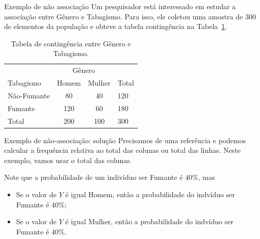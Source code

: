 \documentclass[9pt]{beamer}
\begin{document}
\begin{frame}{Exemplo de não associação}
Um pesquisador está interessado em estudar a associação entre Gênero e Tabagismo. Para isso, ele coletou uma amostra de 300 de elementos da população e obteve a tabela contingência na Tabela~\ref{tab:nao-associacao}.
\begin{table}[htbp]
	\centering
	\caption{Tabela de contingência entre Gênero e Tabagismo.}
	\label{tab:nao-associacao}
	\begin{tabular}{l|cc|l}
		\toprule[0.05cm]
		& \multicolumn{2}{|c|}{Gênero} & \\ \cmidrule{2-3}
		Tabagismo & Homem & Mulher & Total\\ \midrule[0.05cm]
		Não-Fumante & 80 & 40 & 120\\
		Fumante & 120 & 60 & 180\\ \midrule[0.05cm]
		Total & 200 & 100 & 300\\ \bottomrule[0.05cm]
	\end{tabular}
\end{table}
\end{frame}

\begin{frame}{Exemplo de não-associação: solução}
Precisamos de uma referência e podemos calcular a frequência relativa ao total das colunas ou total das linhas. Neste exemplo, vamos usar o total das colunas.
\begin{table}[htbp]
	\centering
	\caption{Tabela de distribuição de frequência relativa ao total das colunas.}
	\label{tab:nao-associacao_rel}
\end{table} 

Note que a probabilidade de um indivíduo ser Fumante é {\color{red} $40\%$}, mas
\begin{itemize}
	\item Se o valor de $Y$ é igual Homem, então a probabilidade do indvíduo ser Fumante é {\color{brown} $40\%$};
	\item Se o valor de $Y$ é igual Mulher, então a probabilidade do indvíduo ser Fumante é {\color{blue} $40\%$}.
\end{itemize}
\end{frame}
\end{document}
